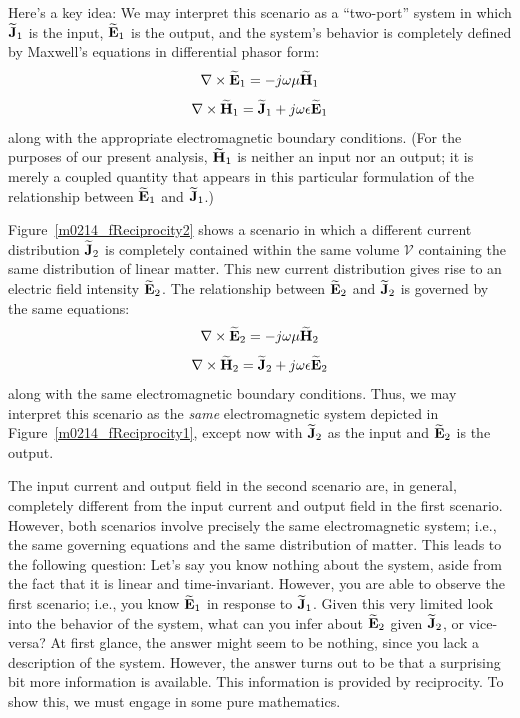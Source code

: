 Here's a key idea:  We may interpret this scenario as a ``two-port'' system in which 
$\widetilde{\bf J}_1$ is the input, $\widetilde{\bf E}_1$ is the output, and the system's behavior is completely defined by Maxwell's equations in differential phasor form:
%
\begin{equation}
\nabla \times  \widetilde{\bf E}_1 = -j\omega\mu\widetilde{\bf H}_1 
\label{m0214_eMCE1}
\end{equation}
%
\begin{equation}
\nabla \times \widetilde{\bf H}_1  = \widetilde{\bf J}_1 + j\omega\epsilon\widetilde{\bf E}_1
\label{m0214_eMCH1} 
\end{equation}
% 
along with the appropriate electromagnetic boundary conditions.
(For the purposes of our present analysis, $\widetilde{\bf H}_1$ is neither an input nor an output; it is merely a coupled quantity that appears in this particular formulation of the relationship between $\widetilde{\bf E}_1$ and $\widetilde{\bf J}_1$.)

Figure~\ref{m0214_fReciprocity2} shows a scenario in which a different current distribution $\widetilde{\bf J}_2$ is completely contained within the same volume $\mathcal{V}$ containing the same distribution of linear matter. 
This new current distribution gives rise to an electric field intensity $\widetilde{\bf E}_2$.  
The relationship between $\widetilde{\bf E}_2$ and $\widetilde{\bf J}_2$ is governed by the same equations:
%
\begin{equation}
\nabla \times  \widetilde{\bf E}_2 = -j\omega\mu\widetilde{\bf H}_2 
\label{m0214_eMCE2}
\end{equation}
%
\begin{equation}
\nabla \times \widetilde{\bf H}_2  = \widetilde{\bf J}_2 + j\omega\epsilon\widetilde{\bf E}_2
\label{m0214_eMCH2} 
\end{equation}
%
along with the same electromagnetic boundary conditions.
Thus, we may interpret this scenario as the \emph{same} electromagnetic system depicted in Figure~\ref{m0214_fReciprocity1}, except now with 
$\widetilde{\bf J}_2$ as the input and $\widetilde{\bf E}_2$ is the output. 

The input current and output field in the second scenario are, in general, completely different from the input current and output field in the first scenario.  However, both scenarios involve precisely the same electromagnetic system; i.e., the same governing equations and the same distribution of matter.
This leads to the following question:
Let's say you know nothing about the system, aside from the fact that it is linear and time-invariant.
However, you are able to observe the first scenario; i.e., you know $\widetilde{\bf E}_1$ in response to $\widetilde{\bf J}_1$.
Given this very limited look into the behavior of the system, what can you infer about $\widetilde{\bf E}_2$ given $\widetilde{\bf J}_2$, or vice-versa?
At first glance, the answer might seem to be nothing, since you lack a description of the system.
However, the answer turns out to be that a surprising bit more information is available.
This information is provided by reciprocity.
To show this, we must engage in some pure mathematics.  

